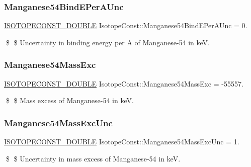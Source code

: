 \subsubsection{\texorpdfstring{Manganese54\+Bind\+E\+Per\+A\+Unc}{Manganese54BindEPerAUnc}}
{\footnotesize\ttfamily \mbox{\hyperlink{group___isotope_const-_macros_ga8f45a7272ce02c0b4c65c44636ed719a}{I\+S\+O\+T\+O\+P\+E\+C\+O\+N\+S\+T\+\_\+\+D\+O\+U\+B\+LE}} Isotope\+Const\+::\+Manganese54\+Bind\+E\+Per\+A\+Unc = 0.}

\$ \$ Uncertainty in binding energy per A of Manganese-\/54 in keV. \mbox{\label{group___isotope_const-_manganese-_mn54_gacb1d8fa387603c8cc259d2c26ebc3451}} 
\subsubsection{\texorpdfstring{Manganese54\+Mass\+Exc}{Manganese54MassExc}}
{\footnotesize\ttfamily \mbox{\hyperlink{group___isotope_const-_macros_ga8f45a7272ce02c0b4c65c44636ed719a}{I\+S\+O\+T\+O\+P\+E\+C\+O\+N\+S\+T\+\_\+\+D\+O\+U\+B\+LE}} Isotope\+Const\+::\+Manganese54\+Mass\+Exc = -\/55557.}

\$ \$ Mass excess of Manganese-\/54 in keV. \mbox{\label{group___isotope_const-_manganese-_mn54_gaf5343fd1b9c14c4468861c625f4243a1}} 
\subsubsection{\texorpdfstring{Manganese54\+Mass\+Exc\+Unc}{Manganese54MassExcUnc}}
{\footnotesize\ttfamily \mbox{\hyperlink{group___isotope_const-_macros_ga8f45a7272ce02c0b4c65c44636ed719a}{I\+S\+O\+T\+O\+P\+E\+C\+O\+N\+S\+T\+\_\+\+D\+O\+U\+B\+LE}} Isotope\+Const\+::\+Manganese54\+Mass\+Exc\+Unc = 1.}

\$ \$ Uncertainty in mass excess of Manganese-\/54 in keV. \mbox{\label{group___isotope_const-_manganese-_mn54_gab07274b28c59936288ed9684803e3877}} 
